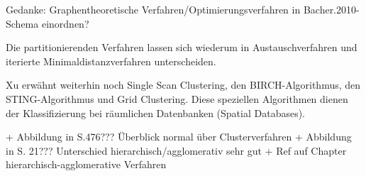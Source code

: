 Gedanke: Graphentheoretische Verfahren/Optimierungsverfahren in Bacher.2010-Schema einordnen?

Die partitionierenden Verfahren lassen sich wiederum in Austauschverfahren und iterierte Minimaldistanzverfahren unterscheiden.

Xu \cite{Xu.1999} erwähnt weiterhin noch Single Scan Clustering, den BIRCH-Algorithmus, den STING-Algorithmus und Grid Clustering. Diese speziellen Algorithmen dienen der Klassifizierung bei räumlichen Datenbanken (Spatial Databases).

+ Abbildung in \cite{Backhaus.2016} S.476??? Überblick normal über Clusterverfahren
+ Abbildung in \cite{Xu.1999} S. 21??? Unterschied hierarchisch/agglomerativ sehr gut
+ Ref auf Chapter hierarchisch-agglomerative Verfahren